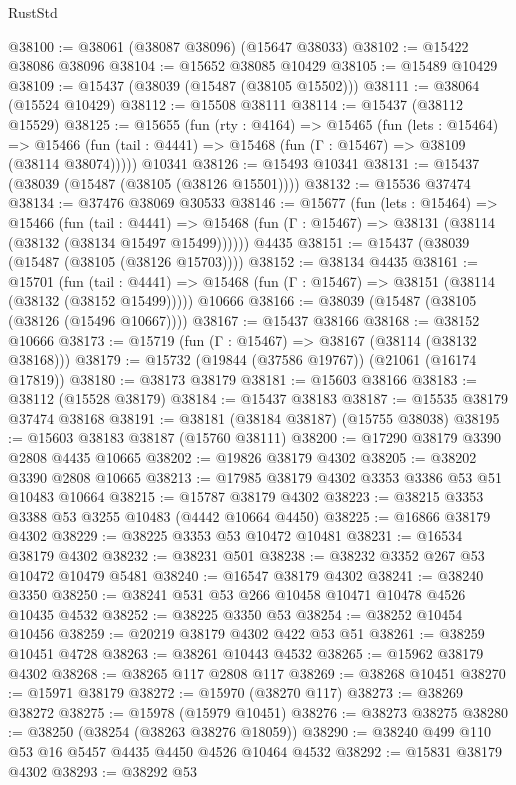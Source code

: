 \begin{lexlean}{RustStd}
\begin{coremodule}
@38100 := @38061 (@38087 @38096) (@15647 @38033)
@38102 := @15422 @38086 @38096
@38104 := @15652 @38085 @10429
@38105 := @15489 @10429
@38109 := @15437 (@38039 (@15487 (@38105 @15502)))
@38111 := @38064 (@15524 @10429)
@38112 := @15508 @38111
@38114 := @15437 (@38112 @15529)
@38125 := @15655
    (fun (rty : @4164) =>
    @15465
      (fun (lets : @15464) =>
      @15466 (fun (tail : @4441) => @15468 (fun (Γ : @15467) => @38109 (@38114 @38074)))))
    @10341
@38126 := @15493 @10341
@38131 := @15437 (@38039 (@15487 (@38105 (@38126 @15501))))
@38132 := @15536 @37474
@38134 := @37476 @38069 @30533
@38146 := @15677
    (fun (lets : @15464) =>
    @15466
      (fun (tail : @4441) =>
      @15468 (fun (Γ : @15467) => @38131 (@38114 (@38132 (@38134 @15497 @15499))))))
    @4435
@38151 := @15437 (@38039 (@15487 (@38105 (@38126 @15703))))
@38152 := @38134 @4435
@38161 := @15701
    (fun (tail : @4441) => @15468 (fun (Γ : @15467) => @38151 (@38114 (@38132 (@38152 @15499)))))
    @10666
@38166 := @38039 (@15487 (@38105 (@38126 (@15496 @10667))))
@38167 := @15437 @38166
@38168 := @38152 @10666
@38173 := @15719 (fun (Γ : @15467) => @38167 (@38114 (@38132 @38168)))
@38179 := @15732 (@19844 (@37586 @19767)) (@21061 (@16174 @17819))
@38180 := @38173 @38179
@38181 := @15603 @38166
@38183 := @38112 (@15528 @38179)
@38184 := @15437 @38183
@38187 := @15535 @38179 @37474 @38168
@38191 := @38181 (@38184 @38187) (@15755 @38038)
@38195 := @15603 @38183 @38187 (@15760 @38111)
@38200 := @17290 @38179 @3390 @2808 @4435 @10665
@38202 := @19826 @38179 @4302
@38205 := @38202 @3390 @2808 @10665
@38213 := @17985 @38179 @4302 @3353 @3386 @53 @51 @10483 @10664
@38215 := @15787 @38179 @4302
@38223 := @38215 @3353 @3388 @53 @3255 @10483 (@4442 @10664 @4450)
@38225 := @16866 @38179 @4302
@38229 := @38225 @3353 @53 @10472 @10481
@38231 := @16534 @38179 @4302
@38232 := @38231 @501
@38238 := @38232 @3352 @267 @53 @10472 @10479 @5481
@38240 := @16547 @38179 @4302
@38241 := @38240 @3350
@38250 := @38241 @531 @53 @266 @10458 @10471 @10478 @4526 @10435 @4532
@38252 := @38225 @3350 @53
@38254 := @38252 @10454 @10456
@38259 := @20219 @38179 @4302 @422 @53 @51
@38261 := @38259 @10451 @4728
@38263 := @38261 @10443 @4532
@38265 := @15962 @38179 @4302
@38268 := @38265 @117 @2808 @117
@38269 := @38268 @10451
@38270 := @15971 @38179
@38272 := @15970 (@38270 @117)
@38273 := @38269 @38272
@38275 := @15978 (@15979 @10451)
@38276 := @38273 @38275
@38280 := @38250 (@38254 (@38263 @38276 @18059))
@38290 := @38240 @499 @110 @53 @16 @5457 @4435 @4450 @4526 @10464 @4532
@38292 := @15831 @38179 @4302
@38293 := @38292 @53

\end{coremodule}
\end{lexlean}
